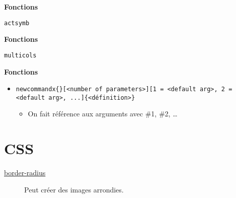 \documentclass[10pt, french]{article}
\begin{document}
\begin{multicols*}{3}
\begin{algo2}[actuarialsymbol]
\textbf{Fonctions}
\begin{description}
	\item	\texttt{actsymb}
\end{description}
\end{algo2}

\begin{algo2}[amsmath]
\end{algo2}

\begin{algo2}[amsymb]
\end{algo2}

\begin{algo2}[multicol]
\textbf{Fonctions}
\begin{description}
	\item	\texttt{multicols}
\end{description}
\end{algo2}

\begin{algo2}[xcolor]
\end{algo2}

\begin{algo2}[tikz]
\end{algo2}

\begin{algo2}[tcolorbox]
\end{algo2}

\begin{algo2}[xargs]
\textbf{Fonctions}
\begin{itemize}[leftmargin = *]
	\item	\texttt{newcommandx\{<nom de la commande>\}[<number of parameters>][1 = <default arg>, 2 = <default arg>, ...]\{<définition>\}}
		\begin{itemize}[leftmargin = *]
		\item	On fait référence aux arguments avec \#1, \#2, \dots
		\end{itemize}
\end{itemize}
\end{algo2}


\newpage

\section{CSS}

\begin{algo2}[images]
\begin{description}
    \item[\href{https://www.w3schools.com/css/css3_images.asp}{border-radius}]  Peut créer des images arrondies.
\end{description}
\end{algo2}

\end{multicols*}
\end{document}
